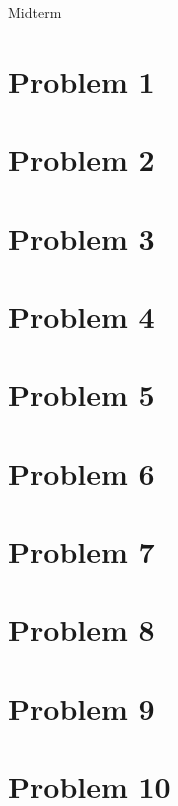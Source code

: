 \documentclass[usletter]{article}
\begin{document}
           {Midterm}   %
           



%
%
%
%
%

\section*{Problem 1}
\newpage

\section*{Problem 2}
\newpage

\section*{Problem 3}
\newpage

\section*{Problem 4}
\newpage

\section*{Problem 5}
\newpage

\section*{Problem 6}
\newpage

\section*{Problem 7}
\newpage

\section*{Problem 8}
\newpage

\section*{Problem 9}
\newpage

\section*{Problem 10}
\end{document}
